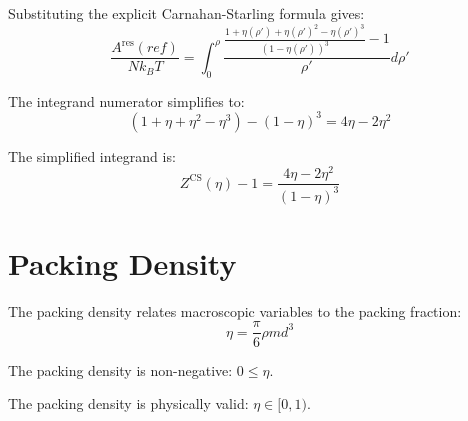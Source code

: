 \begin{theorem}
\label{thm:substitute_z_into_integral}
\leanok
Substituting the explicit Carnahan-Starling formula gives:
$$\frac{A^{\text{res}}(ref)}{Nk_BT} = \int_0^\rho \frac{\frac{1 + \eta(\rho') + \eta(\rho')^2 - \eta(\rho')^3}{(1 - \eta(\rho'))^3} - 1}{\rho'} d\rho'$$
\end{theorem}

\begin{theorem}
\label{thm:cs_numerator_identity}
\leanok
The integrand numerator simplifies to:
$$(1 + \eta + \eta^2 - \eta^3) - (1 - \eta)^3 = 4\eta - 2\eta^2$$
\end{theorem}

\begin{theorem}
\label{thm:cs_simplify_integrand}
\leanok
The simplified integrand is:
$$Z^{\text{CS}}(\eta) - 1 = \frac{4\eta - 2\eta^2}{(1 - \eta)^3}$$
\end{theorem}

\section{Packing Density}

\begin{definition}
\label{def:packing_density_fn}
\leanok
The packing density relates macroscopic variables to the packing fraction:
$$\eta = \frac{\pi}{6} \rho m d^3$$
\end{definition}

\begin{theorem}
\label{thm:packing_density_nonneg}
\leanok
The packing density is non-negative: $0 \leq \eta$.
\end{theorem}

\begin{theorem}
\label{thm:packing_density_mem_Ico}
\leanok
The packing density is physically valid: $\eta \in [0, 1)$.
\end{theorem}

